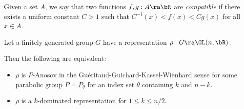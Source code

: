 %

Given a set $A$, 
we say that two functions $f, g:A \ra \bR$ are {\em compatible} if 
there exists a uniform constant $C>1$ such that 
$C^{-1} (x) < f(x) < C g(x)$ for all $x\in A$. 

\begin{lemma}\label{lem:Equiv} 
	Let a finitely generated  group $G$ have a representation $\rho:G \ra \GL(n, \bR)$.

	Then the following are equivalent\/{\em :} 
	\begin{itemize} 
	\item  $\rho$ is $P$-Anosov in the Gu\'eritaud-Guichard-Kassel-Wienhard sense \cite{GGKW17ii}
	for some parabolic group $P = P_\theta$ for an index set $\theta$ containing  $k$
	and $n-k$. 
	\item  $\rho$ is a $k$-dominated representation 
	for $1 \leq k \leq n/2$. 
	\end{itemize} 
\end{lemma} 
